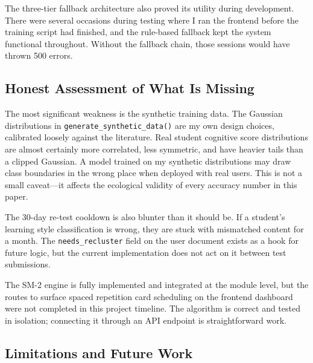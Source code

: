 \documentclass[12pt,a4paper]{article}
\begin{document}
The three-tier fallback architecture also proved its utility during
development. There were several occasions during testing where I
ran the frontend before the training script had finished, and the
rule-based fallback kept the system functional throughout. Without
the fallback chain, those sessions would have thrown 500 errors.

\subsection{Honest Assessment of What Is Missing}

The most significant weakness is the synthetic training data. The
Gaussian distributions in \texttt{generate\_synthetic\_data()} are
my own design choices, calibrated loosely against the literature.
Real student cognitive score distributions are almost certainly
more correlated, less symmetric, and have heavier tails than a
clipped Gaussian. A model trained on my synthetic distributions may
draw class boundaries in the wrong place when deployed with real
users. This is not a small caveat---it affects the ecological
validity of every accuracy number in this paper.

The 30-day re-test cooldown is also blunter than it should be.
If a student's learning style classification is wrong, they are
stuck with mismatched content for a month. The \texttt{needs\_recluster}
field on the user document exists as a hook for future logic, but
the current implementation does not act on it between test submissions.

The SM-2 engine is fully implemented and integrated at the
module level, but the routes to surface spaced repetition card
scheduling on the frontend dashboard were not completed in this
project timeline. The algorithm is correct and tested in isolation;
connecting it through an API endpoint is straightforward work.

\subsection{Limitations and Future Work}
\end{document}

